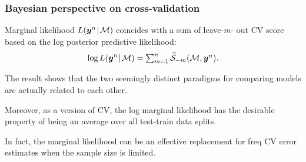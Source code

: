 \documentclass[18pt]{beamer}
\newcommand{\defineTightSpacing}{%
	\setlength{\abovedisplayskip}{.25\baselineskip}%
	\setlength{\belowdisplayskip}{.25\baselineskip}%
}
\renewcommand{\textsc}[1]{{\small \MakeUppercase{#1}}}
\newcommand{\given}{\thinnerspace | \thinnerspace}
\newcommand{\thinnerspace}{\mskip.5\thinmuskip}
\newcommand{\likelihood}{L}
\newcommand{\by}{\bm{y}}
\newcommand{\score}{\mathcal{S}}
\newcommand{\modelSymbol}{\mathcal{M}}
\newcommand{\trainingSize}{m}
\begin{document}
\begin{frame}
\frametitle{Bayesian perspective on cross-validation}
\begin{theorem}
\normalfont
Marginal likelihood $\likelihood(\by^n \given \modelSymbol)$ coincides with a sum of leave-$\trainingSize$- out \textsc{CV} score based on the log posterior predictive likelihood:
\begin{equation*} \defineTightSpacing%
\log \likelihood(\by^n \given \modelSymbol)
	= \textstyle \sum_{\trainingSize = 1}^n \widehat{\score}_{-\trainingSize}(\modelSymbol, \by^n).
\end{equation*}
\end{theorem}

\pause
The result shows that the two seemingly distinct paradigms for comparing models are actually related to each other.

\pause
Moreover, as a version of \textsc{CV}, the log marginal likelihood has the desirable property of being an average over all test-train data splits.

\pause
In fact, the marginal likelihood can be an effective replacement for freq \textsc{CV} error estimates when the sample size is limited.
\end{frame}
\end{document}
